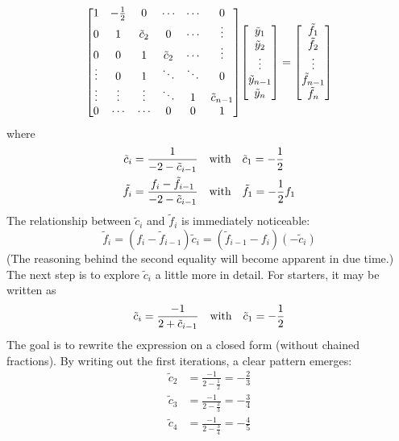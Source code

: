 \documentclass[reprint,english]{revtex4-1}
\begin{document}
\[\mqty[1 & -\frac{1}{2} & 0 & \cdots & \cdots & 0 \\
0 & 1 & \tilde{c}_2 & 0 & \cdots & \vdots \\
0 & 0 & 1 & \tilde{c}_2 & \cdots & \vdots \\
\vdots & 0 & 1 & \ddots & \ddots & 0 \\
\vdots & \vdots & \vdots & \ddots & 1 & \tilde{c}_{n-1} \\
0 & \cdots & \cdots & 0 & 0 & 1]\mqty[\tilde{y}_1 \\ \tilde{y}_2 \\ \vdots \\ \tilde{y}_{n-1} \\ \tilde{y}_n]=\mqty[\tilde{f}_1 \\ \tilde{f}_2 \\ \vdots \\ \tilde{f}_{n-1} \\ \tilde{f}_n]\]
where
\begin{align}
\tilde{c}_i&=\frac{1}{-2-\tilde{c}_{i-1}}\qq{with}\tilde{c}_1=-\frac{1}{2}\\
\tilde{f}_i&=\frac{f_i-\tilde{f}_{i-1}}{-2-\tilde{c}_{i-1}}\qq{with}\tilde{f}_1=-\frac{1}{2}f_1
\end{align}
The relationship between \(\tilde{c}_i\) and \(\tilde{f}_i\) is immediately noticeable:
\begin{equation}\label{eq:f_tilde_recursion_relation}
\tilde{f}_i=(f_i-\tilde{f}_{i-1})\tilde{c}_i=(\tilde{f}_{i-1}-f_i)(-\tilde{c}_i)
\end{equation}
(The reasoning behind the second equality will become apparent in due time.)
\newpage
The next step is to explore \(\tilde{c}_i\) a little more in detail. For starters, it may be written as
\begin{equation}\label{eq:tilde_c_requirement}
\tilde{c}_i=\frac{-1}{2+\tilde{c}_{i-1}}\qq{with}\tilde{c}_1=-\frac{1}{2}
\end{equation}
The goal is to rewrite the expression on a closed form (without chained fractions). By writing out the first iterations, a clear pattern emerges:
\begin{align*}
\tilde{c}_2&=\frac{-1}{2-\frac{1}{2}}=-\frac{2}{3}\\
\tilde{c}_3&=\frac{-1}{2-\frac{2}{3}}=-\frac{3}{4}\\
\tilde{c}_4&=\frac{-1}{2-\frac{3}{4}}=-\frac{4}{5}
\end{align*}
\end{document}
